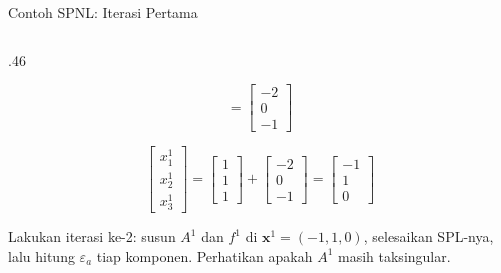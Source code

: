 \documentclass[aspectratio=169,10pt]{beamer}
\begin{document}
\begin{frame}{Contoh SPNL: Iterasi Pertama}
\begin{columns}[T,totalwidth=\textwidth]
\begin{column}{.46\textwidth}
\begin{greenbox}
\[=\begin{bmatrix}-2\\ 0\\ -1\end{bmatrix}
\]
\end{greenbox}
\begin{purplebox}[Perbarui]
\[
\begin{bmatrix}x_1^1\\ x_2^1\\ x_3^1\end{bmatrix}
=\begin{bmatrix}1\\1\\1\end{bmatrix}+\begin{bmatrix}-2\\0\\-1\end{bmatrix}
=\begin{bmatrix}-1\\ 1\\ 0\end{bmatrix}
\]
\end{purplebox}
\begin{goldbox}
Lakukan iterasi ke-2: susun $A^1$ dan $f^1$ di $\mathbf{x}^1=(-1,1,0)$, selesaikan SPL-nya, lalu hitung $\varepsilon_a$ tiap komponen. Perhatikan apakah $A^1$ masih taksingular.
\end{goldbox}
\end{column}
\end{columns}
\end{frame}
\end{document}
